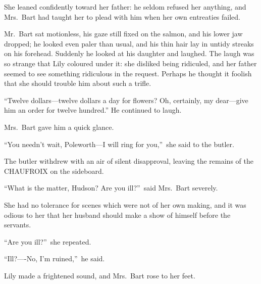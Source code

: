 \documentclass[12pt,a4paper]{book}
\begin{document}
She leaned confidently toward her father: he seldom refused her
anything, and Mrs.\ Bart had taught her to plead with him when her
own entreaties failed.





Mr.\ Bart sat motionless, his gaze still fixed on the salmon, and
his lower jaw dropped; he looked even paler than usual, and his
thin hair lay in untidy streaks on his forehead. Suddenly he
looked at his daughter and laughed. The laugh was so strange that
Lily coloured under it: she disliked being ridiculed, and her
father seemed to see something ridiculous in the request. Perhaps
he thought it foolish that she should trouble him about such a
trifle.





``Twelve dollars---twelve dollars a day for flowers? Oh, certainly,
my dear---give him an order for twelve hundred.'' He continued to
laugh.





Mrs.\ Bart gave him a quick glance.





``You needn't wait, Poleworth---I will ring for you,''\ she said to
the butler.





The butler withdrew with an air of silent disapproval, leaving
the remains of the CHAUFROIX on the sideboard.





``What is the matter, Hudson? Are you ill?''\ said Mrs.\ Bart
severely.





She had no tolerance for scenes which were not of her own making,
and it was odious to her that her husband should make a show of
himself before the servants.





``Are you ill?''\ she repeated.





``Ill?----No, I'm ruined,''\ he said.





Lily made a frightened sound, and Mrs.\ Bart rose to her
feet.
\end{document}
